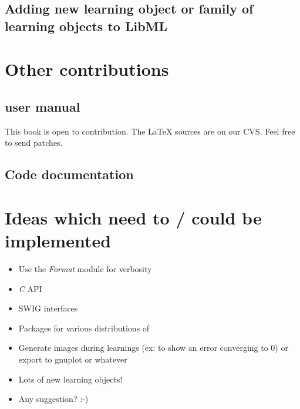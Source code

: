 \section{Adding new learning object or family of learning objects to LibML}


\chapter{Other contributions}
\section{user manual}
This book is open to contribution. The \LaTeX{} sources are on our CVS. Feel free to send patches.

\section{Code documentation}

\chapter{Ideas which need to / could be implemented}
\begin{itemize}
\item Use the \textit{Format} module for verbosity
\item \textit{C} API
\item SWIG interfaces
\item Packages for various distributions of 
\item Generate images during learnings (ex: to show an error converging to 0) or export to gnuplot or whatever
\item Lots of new learning objects!
\item Any suggestion? :-)
\end{itemize}
